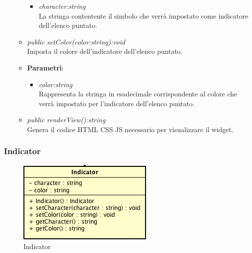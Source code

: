 \begin{itemize}
\begin{itemize}
{\begin{itemize}
		\item \textit{character:string}\\
		La stringa contentente il simbolo che verrà impostato come indicatore dell'elenco puntato.
		\end{itemize}}
	\item \textit{public setColor(color:string):void}\\
	Imposta il colore dell'indicatore dell'elenco puntato.
		\item{\textbf{Parametri}: \begin{itemize}
		\item \textit{color:string}\\
		Rappresenta la stringa in esadecimale corrispondente al colore che verrà impostato per l'indicatore dell'elenco puntato.
		\end{itemize}}
	\item \textit{public renderView():string}\\
	Genera il codice HTML CSS JS necessario per visualizzare il widget.
	\end{itemize}
\end{itemize}

\subsubsection{Indicator}

\label{Indicator}
\begin{figure}[ht]
	\centering
	\includegraphics[scale=0.5]{Sezioni/SottosezioniST/img/Indicator.png}
	\caption{Indicator}
\end{figure}


